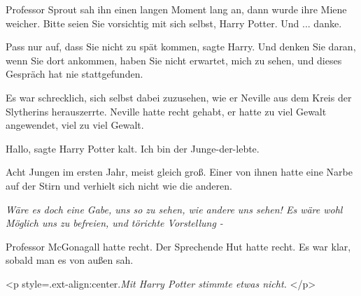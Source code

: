 Professor Sprout sah ihn einen langen Moment lang an, dann wurde ihre Miene
weicher. \glqq Bitte seien Sie vorsichtig mit sich selbst, Harry Potter. Und ...
danke.\grqq{}

\glqq Pass nur auf, dass Sie nicht zu spät kommen\grqq{}, sagte Harry. \glqq
Und denken Sie daran, wenn Sie dort ankommen, haben Sie nicht erwartet, mich zu
sehen, und dieses Gespräch hat nie stattgefunden.\grqq{}

Es war schrecklich, sich selbst dabei zuzusehen, wie er Neville aus dem Kreis
der Slytherins herauszerrte. Neville hatte recht gehabt, er hatte zu viel Gewalt
angewendet, viel zu viel Gewalt.

\glqq Hallo\grqq{}, sagte Harry Potter kalt. \glqq Ich bin der
Junge-der-lebte.\grqq{}

Acht Jungen im ersten Jahr, meist gleich groß. Einer von ihnen hatte eine Narbe
auf der Stirn und verhielt sich nicht wie die anderen.

\emph{Wäre es doch eine Gabe, uns so zu sehen, wie andere uns sehen! Es wäre
wohl Möglich uns zu befreien, und törichte Vorstellung - }

Professor McGonagall hatte recht. Der Sprechende Hut hatte recht. Es war klar,
sobald man es von außen sah.

<p style=\grqq{}.ext-align:center\grqq{}.\emph{Mit Harry Potter stimmte etwas
nicht. }</p>

